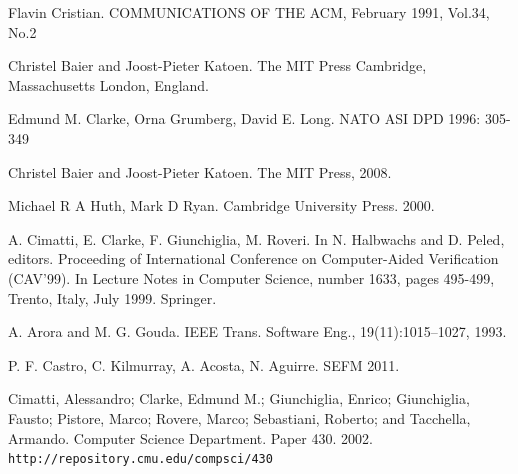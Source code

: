 \documentclass[titlepage, 12pt]{book}
\begin{document}
\begin{thebibliography}{99}
Flavin Cristian.
\newblock COMMUNICATIONS OF THE ACM, February 1991, Vol.34, No.2


Christel Baier and Joost-Pieter Katoen.
\newblock The MIT Press Cambridge, Massachusetts London, England.


Edmund M. Clarke, Orna Grumberg, David E. Long.
\newblock NATO ASI DPD 1996: 305-349


Christel Baier and Joost-Pieter Katoen.
\newblock The MIT Press, 2008.


Michael R A Huth, Mark D Ryan.
\newblock Cambridge University Press. 2000.


A. Cimatti, E. Clarke, F. Giunchiglia, M. Roveri. 
\newblock In N. Halbwachs and D. Peled, editors. Proceeding of International Conference on Computer-Aided Verification (CAV'99). In Lecture Notes in Computer Science, number 1633, pages 495-499, Trento, Italy, July 1999. Springer.


A. Arora and M. G. Gouda. 
\newblock IEEE Trans. Software Eng., 19(11):1015–1027, 1993.


P. F. Castro, C. Kilmurray, A. Acosta, N. Aguirre. 
\newblock SEFM 2011.


Cimatti, Alessandro; Clarke, Edmund M.; Giunchiglia, Enrico; Giunchiglia, Fausto; Pistore, Marco; Rovere, Marco; Sebastiani,
Roberto; and Tacchella, Armando.
\newblock Computer Science Department. Paper 430. 2002.
\newblock \texttt{http://repository.cmu.edu/compsci/430}


\end{thebibliography}
\end{document}
